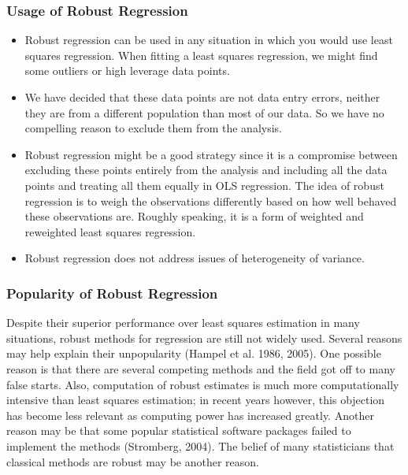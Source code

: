 \documentclass[residuals.tex]{subfiles}
\begin{document}
\subsubsection*{Usage of Robust Regression}
\begin{itemize}
\item Robust regression can be used in any situation in which you would use least squares regression. 
When fitting a least squares regression, we might find some outliers or high leverage data points.
\item We have decided that these data points are not data entry errors, neither they are from a different population 
than most of our data. So we have no compelling reason to exclude them from the analysis. 
\item Robust regression might be a good strategy since it is a compromise between excluding these points entirely from the analysis and including all the data points and treating all them equally in OLS regression. The idea of robust regression is to weigh the observations differently based on how well behaved these observations are. Roughly speaking, it is a form of weighted and reweighted least squares regression.
\item Robust regression does not address issues of heterogeneity of variance. 
\end{itemize}
\newpage
\subsubsection*{Popularity of Robust Regression}
Despite their superior performance over least squares estimation in many situations, robust methods for regression are still not widely used. Several reasons may help explain their unpopularity (Hampel et al. 1986, 2005). One possible reason is that there are several competing methods and the field got off to many false starts. Also, computation of robust estimates is much more computationally intensive than least squares estimation; in recent years however, this objection has become less relevant as computing power has increased greatly. Another reason may be that some popular statistical software packages failed to implement the methods (Stromberg, 2004). The belief of many statisticians that classical methods are robust may be another reason.
\end{document}

